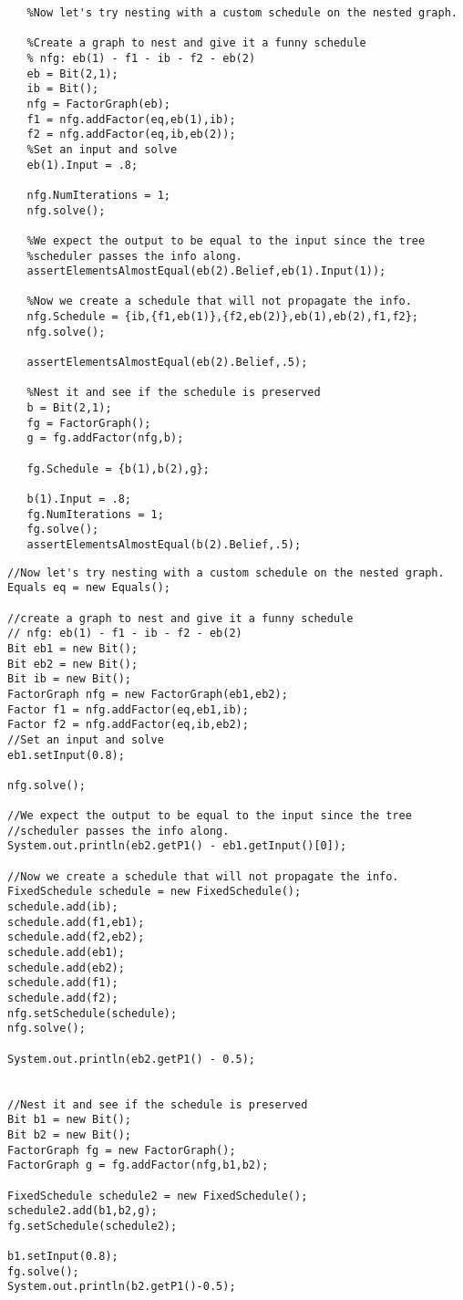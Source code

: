 \begin{lstlisting}
   %Now let's try nesting with a custom schedule on the nested graph.
   
   %Create a graph to nest and give it a funny schedule    
   % nfg: eb(1) - f1 - ib - f2 - eb(2)
   eb = Bit(2,1);
   ib = Bit();
   nfg = FactorGraph(eb);
   f1 = nfg.addFactor(eq,eb(1),ib);
   f2 = nfg.addFactor(eq,ib,eb(2));
   %Set an input and solve
   eb(1).Input = .8;
   
   nfg.NumIterations = 1;
   nfg.solve();
   
   %We expect the output to be equal to the input since the tree
   %scheduler passes the info along.
   assertElementsAlmostEqual(eb(2).Belief,eb(1).Input(1));
   
   %Now we create a schedule that will not propagate the info.
   nfg.Schedule = {ib,{f1,eb(1)},{f2,eb(2)},eb(1),eb(2),f1,f2};
   nfg.solve();
   
   assertElementsAlmostEqual(eb(2).Belief,.5);

   %Nest it and see if the schedule is preserved
   b = Bit(2,1);
   fg = FactorGraph();
   g = fg.addFactor(nfg,b);
   
   fg.Schedule = {b(1),b(2),g};
   
   b(1).Input = .8;
   fg.NumIterations = 1;
   fg.solve();
   assertElementsAlmostEqual(b(2).Belief,.5);
\end{lstlisting}

\fi

\ifjava

\begin{lstlisting}
//Now let's try nesting with a custom schedule on the nested graph.
Equals eq = new Equals();
	
//create a graph to nest and give it a funny schedule    
// nfg: eb(1) - f1 - ib - f2 - eb(2)
Bit eb1 = new Bit();
Bit eb2 = new Bit();
Bit ib = new Bit();
FactorGraph nfg = new FactorGraph(eb1,eb2);
Factor f1 = nfg.addFactor(eq,eb1,ib);
Factor f2 = nfg.addFactor(eq,ib,eb2);
//Set an input and solve
eb1.setInput(0.8);

nfg.solve();

//We expect the output to be equal to the input since the tree
//scheduler passes the info along.
System.out.println(eb2.getP1() - eb1.getInput()[0]);

//Now we create a schedule that will not propagate the info.
FixedSchedule schedule = new FixedSchedule();
schedule.add(ib);
schedule.add(f1,eb1);
schedule.add(f2,eb2);
schedule.add(eb1);
schedule.add(eb2);
schedule.add(f1);
schedule.add(f2);
nfg.setSchedule(schedule);
nfg.solve();

System.out.println(eb2.getP1() - 0.5);

		
//Nest it and see if the schedule is preserved
Bit b1 = new Bit();
Bit b2 = new Bit();
FactorGraph fg = new FactorGraph();
FactorGraph g = fg.addFactor(nfg,b1,b2);

FixedSchedule schedule2 = new FixedSchedule();
schedule2.add(b1,b2,g);
fg.setSchedule(schedule2);

b1.setInput(0.8);		
fg.solve();
System.out.println(b2.getP1()-0.5);

\end{lstlisting}

